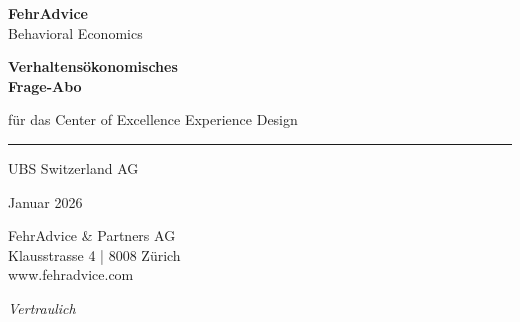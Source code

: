 \documentclass[11pt,a4paper]{article}
\begin{document}
\begin{titlepage}
\begin{center}
\vspace*{2cm}

{\Huge\color{fadarkblue}\textbf{FehrAdvice}}\\[0.3cm]
{\large\color{falightblue}Behavioral Economics}

\vspace{2cm}

{\Huge\bfseries\color{fadarkblue}Verhaltensökonomisches\\[0.3cm]Frage-Abo\par}

\vspace{1cm}

{\Large\color{falightblue}für das Center of Excellence Experience Design\par}

\vspace{1cm}

{\color{fadarkblue}\rule{\textwidth}{2pt}}

\vspace{2cm}

{\large UBS Switzerland AG\par}

\vspace{0.5cm}

{\large Januar 2026\par}

\vfill

{\small\color{fadarkgray}
FehrAdvice \& Partners AG\\
Klausstrasse 4 | 8008 Zürich\\
www.fehradvice.com
}

\vspace{1cm}
{\small\color{fadarkgray}\textit{Vertraulich}}

\end{center}
\end{titlepage}

\tableofcontents
\newpage

\end{document}
